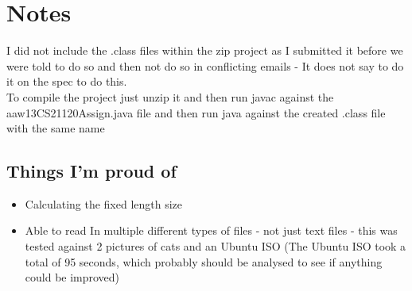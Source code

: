 \documentclass[11pt, oneside]{amsart}
\begin{document}
\section{Notes}
I did not include the .class files within the zip project as I submitted it before we were told to do so and then not do so in conflicting emails - It does not say to do it on the spec to do this. \\
To compile the project just unzip it and then run javac against the aaw13CS21120Assign.java file and then run java against the created .class file with the same name

\subsection{Things I'm proud of}
\begin{itemize}
	\item Calculating the fixed length size
	\item Able to read In multiple different types of files - not just text files - this was tested against 2 pictures of cats and an Ubuntu ISO (The Ubuntu ISO took a total of 95 seconds, which probably should be analysed to see if anything could be improved)
\end{itemize}
\end{document}
